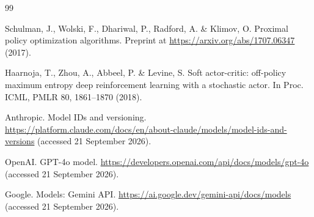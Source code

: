 \documentclass[10pt]{article}
\begin{document}
\begin{thebibliography}{99}

 Schulman, J., Wolski, F., Dhariwal, P., Radford, A. \& Klimov, O. Proximal policy optimization algorithms. Preprint at \url{https://arxiv.org/abs/1707.06347} (2017).

 Haarnoja, T., Zhou, A., Abbeel, P. \& Levine, S. Soft actor-critic: off-policy maximum entropy deep reinforcement learning with a stochastic actor. In Proc. ICML, PMLR 80, 1861--1870 (2018).

 Anthropic. Model IDs and versioning. \url{https://platform.claude.com/docs/en/about-claude/models/model-ids-and-versions} (accessed 21 September 2026).

 OpenAI. GPT-4o model. \url{https://developers.openai.com/api/docs/models/gpt-4o} (accessed 21 September 2026).

 Google. Models: Gemini API. \url{https://ai.google.dev/gemini-api/docs/models} (accessed 21 September 2026).
\end{thebibliography}
\end{document}
